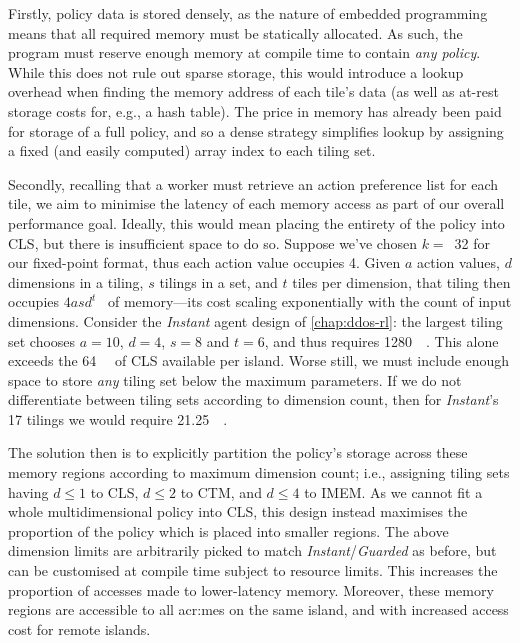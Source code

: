 Firstly, policy data is stored densely, as the nature of embedded programming means that all required memory must be statically allocated.
As such, the program must reserve enough memory at compile time to contain \emph{any policy}.
While this does not rule out sparse storage, this would introduce a lookup overhead when finding the memory address of each tile's data (as well as at-rest storage costs for, e.g., a hash table).
The price in memory has already been paid for storage of a full policy, and so a dense strategy simplifies lookup by assigning a fixed (and easily computed) array index to each tiling set.

Secondly, recalling that a worker must retrieve an action preference list for each tile, we aim to minimise the latency of each memory access as part of our overall performance goal.
Ideally, this would mean placing the entirety of the policy into CLS, but there is insufficient space to do so.
Suppose we've chosen $k=$~\num{32} for our fixed-point format, thus each action value occupies \qty{4}{\byte}.
Given $a$ action values, $d$ dimensions in a tiling, $s$ tilings in a set, and $t$ tiles per dimension, that tiling then occupies $4asd^t$~\unit{\byte} of memory---its cost scaling exponentially with the count of input dimensions.
Consider the \emph{Instant} agent design of \cref{chap:ddos-rl}: the largest tiling set chooses $a=10$, $d=4$, $s=8$ and $t=6$, and thus requires \qty{1280}{\kibi\byte}.
This alone exceeds the \qty{64}{\kibi\byte} of CLS available per island.
Worse still, we must include enough space to store \emph{any} tiling set below the maximum parameters.
If we do not differentiate between tiling sets according to dimension count, then for \emph{Instant}'s \num{17} tilings we would require \qty{21.25}{\mebi\byte}.

The solution then is to explicitly partition the policy's storage across these memory regions according to maximum dimension count; i.e., assigning tiling sets having $d\le1$ to CLS, $d\le2$ to CTM, and $d\le4$ to IMEM.
As we cannot fit a whole multidimensional policy into CLS, this design instead maximises the proportion of the policy which is placed into smaller regions.
The above dimension limits are arbitrarily picked to match \emph{Instant}/\emph{Guarded} as before, but can be customised at compile time subject to resource limits.
This increases the proportion of accesses made to lower-latency memory.
Moreover, these memory regions are accessible to all \glspl{acr:me} on the same island, and with increased access cost for remote islands.


